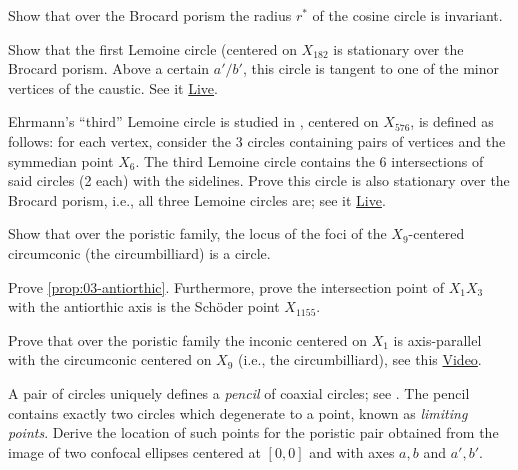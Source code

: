 \begin{exercise}
Show that over the Brocard porism the radius $r^*$ of the cosine circle is invariant.
\end{exercise}

\begin{exercise}
Show that the first Lemoine circle (centered on $X_{182}$ is stationary over the Brocard porism. Above a certain $a'/b'$, this circle is tangent to one of the minor vertices of the caustic. See it \href{https://bit.ly/3tp0XUq}{Live}.
\end{exercise}

\begin{exercise}
Ehrmann's ``third'' Lemoine circle is studied in \cite{darij2012-ehrmann}, centered on $X_{576}$, is defined as follows: for each vertex, consider the 3 circles containing pairs of vertices and the symmedian point $X_6$. The third Lemoine circle contains the 6 intersections of said circles (2 each) with the sidelines. Prove this circle is also stationary over the Brocard porism, i.e., all three Lemoine circles are; see it \href{https://bit.ly/3tw09gA}{Live}. 
\end{exercise}

\begin{exercise}
Show that over the poristic family, the locus of the foci of the $X_9$-centered circumconic (the circumbilliard) is a circle.
\end{exercise}

\begin{exercise}
Prove \cref{prop:03-antiorthic}. Furthermore, prove the intersection point of $X_1 X_3$ with the antiorthic axis is the Schöder point $X_{1155}$.
\end{exercise}

\begin{exercise}
Prove that over the poristic family the inconic centered on $X_1$ is axis-parallel with the circumconic centered on $X_9$ (i.e., the circumbilliard), see this \href{https://youtu.be/0VHBjdHXbJc}{Video}.
\end{exercise}

\begin{exercise}
A pair of circles uniquely defines a {\em pencil} of coaxial circles; see \cite[Limiting Points]{mw}. The pencil contains exactly two circles which degenerate to a point, known as {\em limiting points}. Derive the location of such points for the poristic pair obtained from the image of two confocal ellipses centered at $[0,0]$ and with axes $a,b$ and $a',b'$.
\end{exercise}

